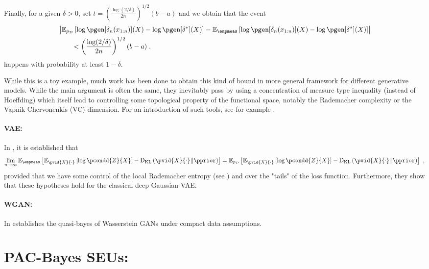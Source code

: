 Finally, for a given $\delta > 0$, set $t = \left(\frac{\log(2 / \delta)}{2 n}\right)^{1/2}(b - a)$ and we obtain that
the event
\begin{align*}
    & \left|\PE{\pdata}{\log \pgen[\decfun_n(\chunk{\lstate}{1}{n})](\state) - \log \pgen[\tmin{\decfun}](\state)} - \PE{\empmeas}{\log \pgen[\decfun_n(\chunk{\lstate}{1}{n})](\state) - \log \pgen[\tmin{\decfun}](\state)}\right| \\
    & \qquad <  \left(\frac{\log(2 / \delta)}{2 n}\right)^{1/2}(b - a) \eqsp.
\end{align*}
happens with probability at least $1 - \delta$.

While this is a toy example, much work has been done to obtain this kind of bound in more general framework for different generative models. While the main argument is often the same, they inevitably pass by using a concentration of measure type inequality (instead of Hoeffding) which itself lead to controlling some topological property
of the functional space, notably the Rademacher complexity or the Vapnik-Chervonenkis (VC) dimension. For an introduction of such tools, see for example \cite[Chapter 8]{vershynin2018highdimensional}.

\paragraph{VAE:}

In \cite{tang2021empirical}, it is established that 
\begin{equation*}
    \lim_{n \rightarrow \infty} \PE{\empmeas}{\PE{\pvid{\state}{\cdot}}{\log\pcondd{Z}{\state}} - \kl{\pvid{\state}{\cdot}}{\pprior}} = \PE{\pdata}{\PE{\pvid{\state}{\cdot}}{\log\pcondd{Z}{\state}} - \kl{\pvid{\state}{\cdot}}{\pprior}} \eqsp,
\end{equation*}
provided that we have some control of the local Rademacher entropy (see \cite[Theorem 14.1]{wainwright2019highdimensional}) and over the "tails" of the loss function. Furthermore, they show that these hypotheses hold for the classical deep Gaussian VAE.

\paragraph{WGAN:}

In \cite[Section 4]{biau2021theoretical} establishes the quasi-bayes of Wasserstein GANs under compact data assumptions.
\section{PAC-Bayes SEUs:}

